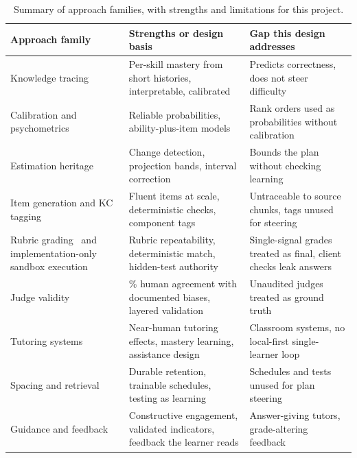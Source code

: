 \begin{table}[htbp]
\centering
\footnotesize
\caption{Summary of approach families, with strengths and limitations for this project.}
\label{tab:litphase2}
\begin{tabular}{>{\raggedright\arraybackslash}p{3.0cm} >{\raggedright\arraybackslash}p{4.2cm} >{\raggedright\arraybackslash}p{4.2cm}}
\toprule
\textbf{Approach family} & \textbf{Strengths or design basis} & \textbf{Gap this design addresses} \\
\midrule
Knowledge tracing~\cite{corbett1995,zanellati2024,mai2025,piech2015} & Per-skill mastery from short histories, interpretable, calibrated & Predicts correctness, does not steer difficulty \\
Calibration and psychometrics~\cite{niculescu2005,embretson2000} & Reliable probabilities, ability-plus-item models & Rank orders used as probabilities without calibration \\
Estimation heritage~\cite{page1954,rasmussen2006,vovk2005} & Change detection, projection bands, interval correction & Bounds the plan without checking learning \\
Item generation and KC tagging~\cite{itemgen2024,lecturequiz2026,kctag2024} & Fluent items at scale, deterministic checks, component tags & Untraceable to source chunks, tags unused for steering \\
Rubric grading~\cite{llmgrade2024} and implementation-only sandbox execution & Rubric repeatability, deterministic match, hidden-test authority & Single-signal grades treated as final, client checks leak answers \\
Judge validity~\cite{zheng2023,kasneci2023} & 80\% human agreement with documented biases, layered validation & Unaudited judges treated as ground truth \\
Tutoring systems~\cite{bloom1984,anderson1995,vanlehn2011,koedinger2007} & Near-human tutoring effects, mastery learning, assistance design & Classroom systems, no local-first single-learner loop \\
Spacing and retrieval~\cite{cepeda2006,settles2016,roediger2006,dunlosky2013} & Durable retention, trainable schedules, testing as learning & Schedules and tests unused for plan steering \\
Guidance and feedback~\cite{chi2014,alhazbi2024,uzun2025,gaming2026,hattie2007,shute2008} & Constructive engagement, validated indicators, feedback the learner reads & Answer-giving tutors, grade-altering feedback \\
\bottomrule
\end{tabular}
\end{table}

